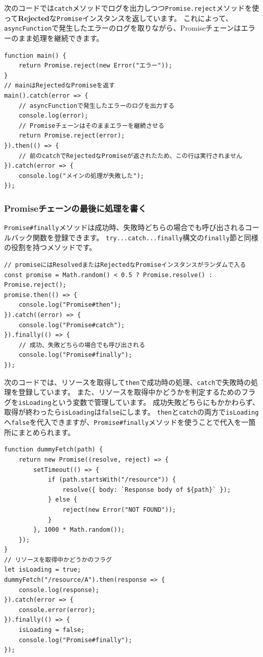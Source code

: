 次のコードでは\texttt{catch}メソッドでログを出力しつつ\texttt{Promise.reject}メソッドを使って\textbf{Rejected}な\texttt{Promise}インスタンスを返しています。
これによって、\texttt{asyncFunction}で発生したエラーのログを取りながら、Promiseチェーンはエラーのまま処理を継続できます。

\begin{lstlisting}
function main() {
    return Promise.reject(new Error("エラー"));
}
// mainはRejectedなPromiseを返す
main().catch(error => {
    // asyncFunctionで発生したエラーのログを出力する
    console.log(error);
    // Promiseチェーンはそのままエラーを継続させる
    return Promise.reject(error);
}).then(() => {
    // 前のcatchでRejectedなPromiseが返されたため、この行は実行されません
}).catch(error => {
    console.log("メインの処理が失敗した");
});
\end{lstlisting}

\hypertarget{promise-finally}{%
\subsubsection{Promiseチェーンの最後に処理を書く\protect{}}\label{promise-finally}}

\texttt{Promise\#finally}メソッドは成功時、失敗時どちらの場合でも呼び出されるコールバック関数を登録できます。
\texttt{try...catch...finally}構文の\texttt{finally}節と同様の役割を持つメソッドです。

\begin{lstlisting}
// promiseにはResolvedまたはRejectedなPromiseインスタンスがランダムで入る
const promise = Math.random() < 0.5 ? Promise.resolve() : Promise.reject();
promise.then(() => {
    console.log("Promise#then");
}).catch((error) => {
    console.log("Promise#catch");
}).finally(() => {
    // 成功、失敗どちらの場合でも呼び出される
    console.log("Promise#finally");
});
\end{lstlisting}

次のコードでは、リソースを取得して\texttt{then}で成功時の処理、\texttt{catch}で失敗時の処理を登録しています。
また、リソースを取得中かどうかを判定するためのフラグを\texttt{isLoading}という変数で管理しています。
成功失敗どちらにもかかわらず、取得が終わったら\texttt{isLoading}は\texttt{false}にします。
\texttt{then}と\texttt{catch}の両方で\texttt{isLoading}へ\texttt{false}を代入できますが、\texttt{Promise\#finally}メソッドを使うことで代入を一箇所にまとめられます。

\begin{lstlisting}
function dummyFetch(path) {
    return new Promise((resolve, reject) => {
        setTimeout(() => {
            if (path.startsWith("/resource")) {
                resolve({ body: `Response body of ${path}` });
            } else {
                reject(new Error("NOT FOUND"));
            }
        }, 1000 * Math.random());
    });
}
// リソースを取得中かどうかのフラグ
let isLoading = true;
dummyFetch("/resource/A").then(response => {
    console.log(response);
}).catch(error => {
    console.error(error);
}).finally(() => {
    isLoading = false;
    console.log("Promise#finally");
});
\end{lstlisting}

